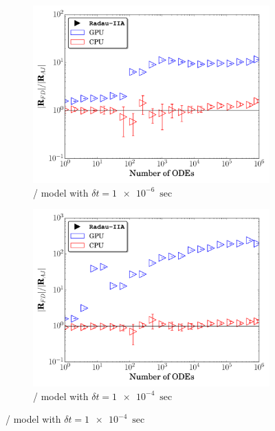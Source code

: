 \documentclass[final,twocolumn]{elsarticle}
\begin{document}
\begin{figure}[htb]
  \ifmeasure
  \fontsize{8pt}{10pt}\selectfont
  \fi
  \centering
  \begin{subfigure}{0.49\textwidth}
      \includegraphics[width=\linewidth]{H2_1e-06_ajac_comp.pdf}
      \caption{\slash{} model with $\delta t = \SI{1e-6}{\sec}$}   
      \label{F:AJ_h2_small}
  \end{subfigure}
  \begin{subfigure}{0.49\textwidth}
      \includegraphics[width=\linewidth]{H2_1e-04_ajac_comp.pdf}
      \caption{\slash{} model with $\delta t = \SI{1e-4}{\sec}$}
      \label{F:AJ_h2_large}
  \end{subfigure}

\end{figure}
\end{document}
